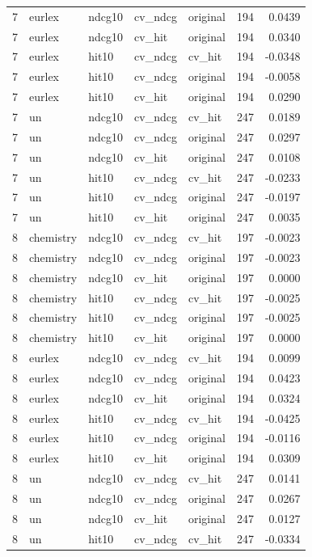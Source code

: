 \begin{tabular}{rllllrr}
7 & eurlex & ndcg10 & cv\_ndcg & original & 194 & 0.0439 \\
7 & eurlex & ndcg10 & cv\_hit & original & 194 & 0.0340 \\
7 & eurlex & hit10 & cv\_ndcg & cv\_hit & 194 & -0.0348 \\
7 & eurlex & hit10 & cv\_ndcg & original & 194 & -0.0058 \\
7 & eurlex & hit10 & cv\_hit & original & 194 & 0.0290 \\
7 & un & ndcg10 & cv\_ndcg & cv\_hit & 247 & 0.0189 \\
7 & un & ndcg10 & cv\_ndcg & original & 247 & 0.0297 \\
7 & un & ndcg10 & cv\_hit & original & 247 & 0.0108 \\
7 & un & hit10 & cv\_ndcg & cv\_hit & 247 & -0.0233 \\
7 & un & hit10 & cv\_ndcg & original & 247 & -0.0197 \\
7 & un & hit10 & cv\_hit & original & 247 & 0.0035 \\
8 & chemistry & ndcg10 & cv\_ndcg & cv\_hit & 197 & -0.0023 \\
8 & chemistry & ndcg10 & cv\_ndcg & original & 197 & -0.0023 \\
8 & chemistry & ndcg10 & cv\_hit & original & 197 & 0.0000 \\
8 & chemistry & hit10 & cv\_ndcg & cv\_hit & 197 & -0.0025 \\
8 & chemistry & hit10 & cv\_ndcg & original & 197 & -0.0025 \\
8 & chemistry & hit10 & cv\_hit & original & 197 & 0.0000 \\
8 & eurlex & ndcg10 & cv\_ndcg & cv\_hit & 194 & 0.0099 \\
8 & eurlex & ndcg10 & cv\_ndcg & original & 194 & 0.0423 \\
8 & eurlex & ndcg10 & cv\_hit & original & 194 & 0.0324 \\
8 & eurlex & hit10 & cv\_ndcg & cv\_hit & 194 & -0.0425 \\
8 & eurlex & hit10 & cv\_ndcg & original & 194 & -0.0116 \\
8 & eurlex & hit10 & cv\_hit & original & 194 & 0.0309 \\
8 & un & ndcg10 & cv\_ndcg & cv\_hit & 247 & 0.0141 \\
8 & un & ndcg10 & cv\_ndcg & original & 247 & 0.0267 \\
8 & un & ndcg10 & cv\_hit & original & 247 & 0.0127 \\
8 & un & hit10 & cv\_ndcg & cv\_hit & 247 & -0.0334 \\

\end{tabular}
